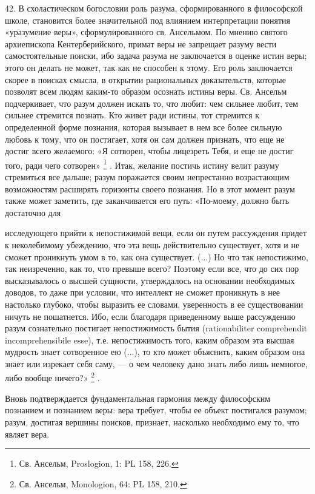 \documentclass[a5paper,10pt]{article}
\begin{document}
42. В схоластическом богословии роль разума, сформированного в философской
школе, становится более значительной под влиянием интерпретации понятия
«уразумение веры», сформулированного св. Ансельмом. По мнению святого
архиепископа Кентерберийского, примат веры не запрещает разуму вести
самостоятельные поиски, ибо задача разума не заключается в оценке истин веры;
этого он делать не может, так как не способен к этому. Его роль заключается
скорее в поисках смысла, в открытии рациональных доказательств, которые
позволят всем людям каким-то образом осознать истины веры. Св. Ансельм
подчеркивает, что разум должен искать то, что любит: чем сильнее любит, тем
сильнее стремится познать. Кто живет ради истины, тот стремится к определенной
форме познания, которая вызывает в нем все более сильную любовь к тому, что он
постигает, хотя он сам должен признать, что еще не достиг всего желаемого: «Я
сотворен, чтобы лицезреть Тебя, и еще не достиг того, ради чего сотворен»
\footnote{Св. Ансельм, Proslogion, 1: PL 158, 226.}  .  Итак, желание постичь
истину велит разуму стремиться все дальше; разум поражается своим непрестанно
возрастающим возможностям расширять горизонты своего познания. Но в этот момент
разум также может заметить, где заканчивается его путь: «По-моему, должно быть
достаточно для

исследующего прийти к непостижимой вещи, если он путем рассуждения придет к
неколебимому убеждению, что эта вещь действительно существует, хотя и не сможет
проникнуть умом в то, как она существует. (...) Но что так непостижимо, так
неизреченно, как то, что превыше всего? Поэтому если все, что до сих пор
высказывалось о высшей сущности, утверждалось на основании необходимых доводов,
то даже при условии, что интеллект не сможет проникнуть в нее настолько
глубоко, чтобы выразить ее словами, уверенность в ее существовании ничуть не
пошатнется. Ибо, если благодаря приведенному выше рассуждению разум сознательно
постигает непостижимость бытия (rationabiliter comprehendit incomprehensibile
esse), т.е. непостижимость того, каким образом эта высшая мудрость знает
сотворенное ею (...), то кто может объяснить, каким образом она знает или
изрекает себя саму, — о чем человеку дано знать либо лишь немногое, либо вообще
ничего?» \footnote{Св. Ансельм, Monologion, 64: PL 158, 210.} .

Вновь подтверждается фундаментальная гармония между философским познанием и
познанием веры: вера требует, чтобы ее объект постигался разумом; разум,
достигая вершины поисков, признает, насколько необходимо ему то, что являет
вера.
\end{document}
